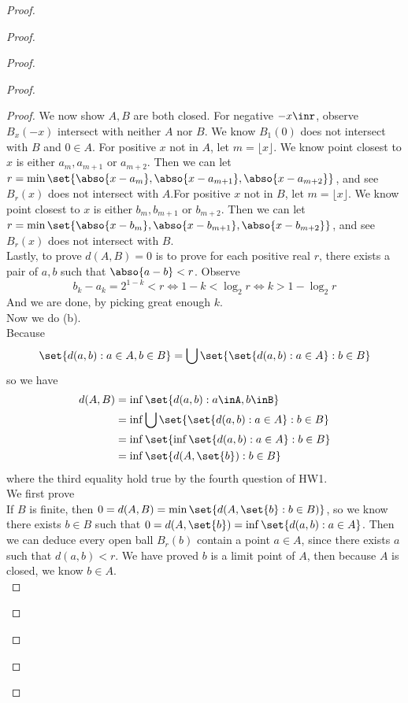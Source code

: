 \documentclass{report}
\begin{document}
\begin{proof}
\begin{proof}
\begin{proof}
\begin{proof}
\begin{proof}
We now show $A,B$ are both closed. For negative  $-x\inr$, observe $B_{x}(-x)$ intersect with neither $A$ nor  $B$. We know $B_1(0)$ does not intersect with $B$ and  $0\in A$. For positive $x$ not in $A$, let $m=\lfloor x \rfloor$. We know point closest to $x$ is either $a_{m},a_{m+1}\text{ or }a_{m+2}$. Then we can let $r=\min \set{\abso{x-a_m},\abso{x-a_{m+1}},\abso{x-a_{m+2}}}$, and see $B_r(x)$ does not intersect with $A$.For positive $x$ not in $B$, let $m=\lfloor x \rfloor$. We know point closest to $x$ is either $b_{m},b_{m+1}\text{ or }b_{m+2}$. Then we can let $r=\min \set{\abso{x-b_m},\abso{x-b_{m+1}},\abso{x-b_{m+2}}}$, and see $B_r(x)$ does not intersect with $B$.\\

Lastly, to prove $d(A,B)=0$ is to prove for each positive real $r$, there exists a pair of $a,b$ such that  $\abso{a-b}<r$. Observe
 \begin{equation*}
b_k-a_k=2^{1-k}<r\iff 1-k<\log_2 r\iff k>1-\log_2 r
\end{equation*}
And we are done, by picking great enough $k$.\\



Now we do (b).\\

Because 
\begin{equation*}
\set{d(a,b):a\in A,b\in B}=\bigcup \set{\set{d(a,b):a\in A}:b \in B}
\end{equation*}
so we have 
\begin{align*}
d(A,B)&=\inf \set{d(a,b):a\inA,b\inB}\\
&=\inf \bigcup \set{\set{d(a,b):a\in A}:b\in B}\\
&=\inf \set{\inf \set{d(a,b):a\in A}:b\in B}\\
&=\inf \set{d(A,\set{b}):b \in B}
\end{align*}
where the third equality hold true by the fourth question of HW1.\\


We first prove \\

If $B$ is finite, then  $0=d(A,B)=\min \set{d(A,\set{b}:b\in B)}$, so we know there exists $b\in B$ such that $0=d(A,\set{b})=\inf \set{d(a,b):a\in A}$. Then we can deduce every open ball $B_r(b)$ contain a point $a\in A$, since there exists $a$ such that  $d(a,b)<r$. We have proved $b$ is a limit point of $A$, then because  $A$ is closed, we know  $b\in A$.\\


\end{proof}
\end{proof}
\end{proof}
\end{proof}
\end{proof}
\end{document}
